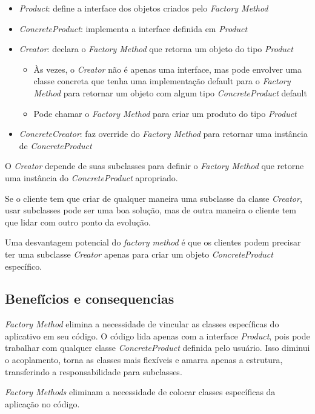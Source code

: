 \begin{itemize}
	\item \emph{Product}: define a interface dos objetos criados pelo \emph{Factory Method}
	\item \emph{ConcreteProduct}: implementa a interface definida em \emph{Product}
	\item \emph{Creator}: declara o \emph{Factory Method} que retorna um objeto do tipo \emph{Product}
		\begin{itemize}
			\item  Às vezes, o \emph{Creator} não é apenas uma interface, mas pode envolver uma
classe concreta que tenha uma implementação default para o \emph{Factory Method} para retornar um objeto com algum tipo \emph{ConcreteProduct} default
			\item Pode chamar o \emph{Factory Method} para criar um produto do tipo \emph{Product}
		\end{itemize}
	\item \emph{ConcreteCreator}: faz override do \emph{Factory Method} para retornar uma instância de \emph{ConcreteProduct}
\end{itemize}

O \emph{Creator} depende de suas subclasses para definir o \emph{Factory Method} que retorne uma instância do \emph{ConcreteProduct} apropriado.

Se o cliente tem que criar de qualquer maneira uma subclasse da classe \emph{Creator}, usar subclasses pode ser uma boa solução, mas de outra maneira o cliente tem que lidar com outro ponto da evolução.

Uma desvantagem potencial do \emph{factory method} é que os clientes podem precisar ter uma subclasse \emph{Creator} apenas para criar um objeto \emph{ConcreteProduct} específico.


\subsection{Benefícios e consequencias}
\label{sub:fac_conse+benef}

\emph{Factory Method} elimina a necessidade de vincular as classes específicas do aplicativo em seu código. O código lida apenas com a interface \emph{Product}, pois pode trabalhar com qualquer classe \emph{ConcreteProduct} definida pelo usuário. Isso diminui o acoplamento, torna as classes mais flexíveis e amarra apenas a estrutura, transferindo a responsabilidade para subclasses.\cite{gamma95}

\emph{Factory Methods} eliminam a necessidade de colocar classes específicas da aplicação no código.\cite{fact2}

